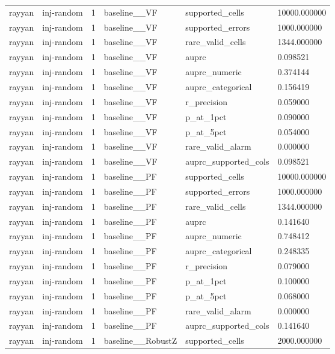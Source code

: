 \begin{tabular}{llllll}
rayyan & inj-random & 1 & baseline\_\_VF & supported\_cells & 10000.000000 \\
rayyan & inj-random & 1 & baseline\_\_VF & supported\_errors & 1000.000000 \\
rayyan & inj-random & 1 & baseline\_\_VF & rare\_valid\_cells & 1344.000000 \\
rayyan & inj-random & 1 & baseline\_\_VF & auprc & 0.098521 \\
rayyan & inj-random & 1 & baseline\_\_VF & auprc\_numeric & 0.374144 \\
rayyan & inj-random & 1 & baseline\_\_VF & auprc\_categorical & 0.156419 \\
rayyan & inj-random & 1 & baseline\_\_VF & r\_precision & 0.059000 \\
rayyan & inj-random & 1 & baseline\_\_VF & p\_at\_1pct & 0.090000 \\
rayyan & inj-random & 1 & baseline\_\_VF & p\_at\_5pct & 0.054000 \\
rayyan & inj-random & 1 & baseline\_\_VF & rare\_valid\_alarm & 0.000000 \\
rayyan & inj-random & 1 & baseline\_\_VF & auprc\_supported\_cols & 0.098521 \\
rayyan & inj-random & 1 & baseline\_\_PF & supported\_cells & 10000.000000 \\
rayyan & inj-random & 1 & baseline\_\_PF & supported\_errors & 1000.000000 \\
rayyan & inj-random & 1 & baseline\_\_PF & rare\_valid\_cells & 1344.000000 \\
rayyan & inj-random & 1 & baseline\_\_PF & auprc & 0.141640 \\
rayyan & inj-random & 1 & baseline\_\_PF & auprc\_numeric & 0.748412 \\
rayyan & inj-random & 1 & baseline\_\_PF & auprc\_categorical & 0.248335 \\
rayyan & inj-random & 1 & baseline\_\_PF & r\_precision & 0.079000 \\
rayyan & inj-random & 1 & baseline\_\_PF & p\_at\_1pct & 0.100000 \\
rayyan & inj-random & 1 & baseline\_\_PF & p\_at\_5pct & 0.068000 \\
rayyan & inj-random & 1 & baseline\_\_PF & rare\_valid\_alarm & 0.000000 \\
rayyan & inj-random & 1 & baseline\_\_PF & auprc\_supported\_cols & 0.141640 \\
rayyan & inj-random & 1 & baseline\_\_RobustZ & supported\_cells & 2000.000000 \\

\end{tabular}
